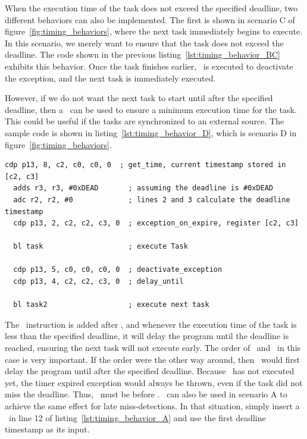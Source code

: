When the execution time of the task does not exceed the specified deadline, two different behaviors can also be implemented.
The first is shown in scenario C of figure~\ref{fig:timing_behaviors}, where the next task immediately begins to execute.
In this scenario, we merely want to ensure that the task does not exceed the deadline. 
The code shown in the previous listing~\ref{lst:timing_behavior_BC} exhibits this behavior. 
Once the task finishes earlier, \deactivateexception\ is executed to deactivate the exception, and the next task is immediately executed.

However, if we do not want the next task to start until after the specified deadline, then a \delayuntil\ can be used to ensure a minimum execution time for the task.
This could be useful if the tasks are synchronized to an external source.   
The sample code is shown in listing~\ref{lst:timing_behavior_D}, which is scenario D in figure~\ref{fig:timing_behaviors}.

\begin{lstlisting}[float=h, label=lst:timing_behavior_D,caption=Assembly code to implement scenario D]
  cdp p13, 8, c2, c0, c0, 0  ; get_time, current timestamp stored in [c2, c3]
  adds r3, r3, #0xDEAD       ; assuming the deadline is #0xDEAD
  adc r2, r2, #0             ; lines 2 and 3 calculate the deadline timestamp
  cdp p13, 2, c2, c2, c3, 0  ; exception_on_expire, register [c2, c3]
   
  bl task                    ; execute Task
  
  cdp p13, 5, c0, c0, c0, 0  ; deactivate_exception
  cdp p13, 4, c2, c2, c3, 0  ; delay_until 
     
  bl task2                   ; execute next task
\end{lstlisting}

The \delayuntil\ instruction is added after \deactivateexception, and whenever the execution time of the task is less than the specified deadline, it will delay the program until the deadline is reached, ensuring the next task will not execute early.
The order of \delayuntil\ and \deactivateexception\ in this case is very important. 
If the order were the other way around, then \delayuntil\ would first delay the program until after the specified deadline. 
Because \deactivateexception\ has not executed yet, the timer expired exception would always be thrown, even if the task did not miss the deadline.
Thus, \deactivateexception\ must be before \delayuntil.
\Delayuntil\ can also be used in scenario A to achieve the same effect for late miss-detections. 
In that situation, simply insert a \delayuntil\ in line 12 of listing~\ref{lst:timing_behavior_A} and use the first deadline timestamp as its input.    
 
